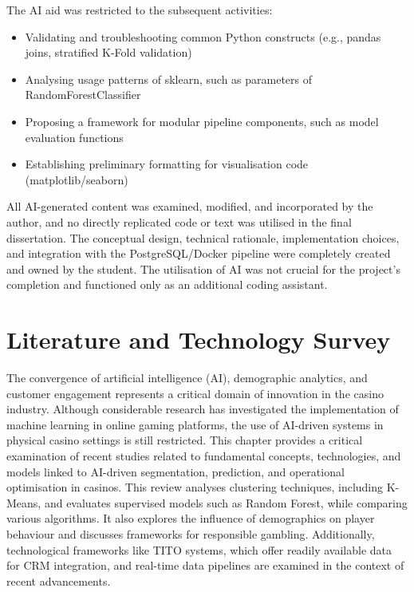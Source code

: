\documentclass[12pt,a4paper]{report}
\begin{document}
The AI aid was restricted to the subsequent activities:
\begin{itemize}
    \item Validating and troubleshooting common Python constructs (e.g., pandas joins, stratified K-Fold validation)
    \item Analysing usage patterns of sklearn, such as parameters of RandomForestClassifier  \citep{scikit-learn}
    \item Proposing a framework for modular pipeline components, such as model evaluation functions
    \item Establishing preliminary formatting for visualisation code (matplotlib/seaborn)
\end{itemize}

All AI-generated content was examined, modified, and incorporated by the author, and no directly replicated code or text was utilised in the final dissertation. The conceptual design, technical rationale, implementation choices, and integration with the PostgreSQL/Docker pipeline were completely created and owned by the student. The utilisation of AI was not crucial for the project's completion and functioned only as an additional coding assistant.


\chapter{Literature and Technology Survey}

The convergence of artificial intelligence (AI), demographic analytics, and customer engagement represents a critical domain of innovation in the casino industry.  Although considerable research has investigated the implementation of machine learning in online gaming platforms, the use of AI-driven systems in physical casino settings is still restricted.  This chapter provides a critical examination of recent studies related to fundamental concepts, technologies, and models linked to AI-driven segmentation, prediction, and operational optimisation in casinos.   This review analyses clustering techniques, including K-Means, and evaluates supervised models such as Random Forest, while comparing various algorithms. It also explores the influence of demographics on player behaviour and discusses frameworks for responsible gambling. Additionally, technological frameworks like TITO systems, which offer readily available data for CRM integration, and real-time data pipelines are examined in the context of recent advancements.
\end{document}
